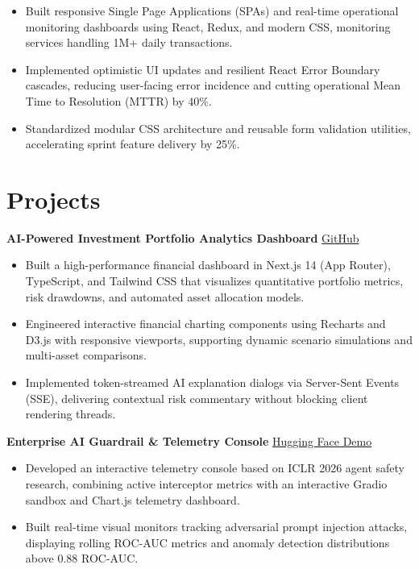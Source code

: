 \documentclass[10pt,a4paper]{article}
\newcommand{\projectheading}[3]{
  \textbf{#1} \hfill
  \href{#2}{#3}\\[-2pt]
}
\begin{document}
\begin{itemize}
  \item Built responsive Single Page Applications (SPAs) and real-time operational monitoring dashboards using React, Redux, and modern CSS, monitoring services handling 1M+ daily transactions.
  \item Implemented optimistic UI updates and resilient React Error Boundary cascades, reducing user-facing error incidence and cutting operational Mean Time to Resolution (MTTR) by 40\%.
  \item Standardized modular CSS architecture and reusable form validation utilities, accelerating sprint feature delivery by 25\%.
\end{itemize}


\section{Projects}

\projectheading
  {AI-Powered Investment Portfolio Analytics Dashboard}
  {https://github.com/sakshi-labs/}
  {GitHub}

\begin{itemize}
  \item Built a high-performance financial dashboard in Next.js 14 (App Router), TypeScript, and Tailwind CSS that visualizes quantitative portfolio metrics, risk drawdowns, and automated asset allocation models.
  \item Engineered interactive financial charting components using Recharts and D3.js with responsive viewports, supporting dynamic scenario simulations and multi-asset comparisons.
  \item Implemented token-streamed AI explanation dialogs via Server-Sent Events (SSE), delivering contextual risk commentary without blocking client rendering threads.
\end{itemize}

\medskip

\projectheading
  {Enterprise AI Guardrail \& Telemetry Console}
  {https://huggingface.co/spaces/Sakshiii/}
  {Hugging Face Demo}

\begin{itemize}
  \item Developed an interactive telemetry console based on ICLR 2026 agent safety research, combining active interceptor metrics with an interactive Gradio sandbox and Chart.js telemetry dashboard.
  \item Built real-time visual monitors tracking adversarial prompt injection attacks, displaying rolling ROC-AUC metrics and anomaly detection distributions above 0.88 ROC-AUC.
\end{itemize}
\end{document}
